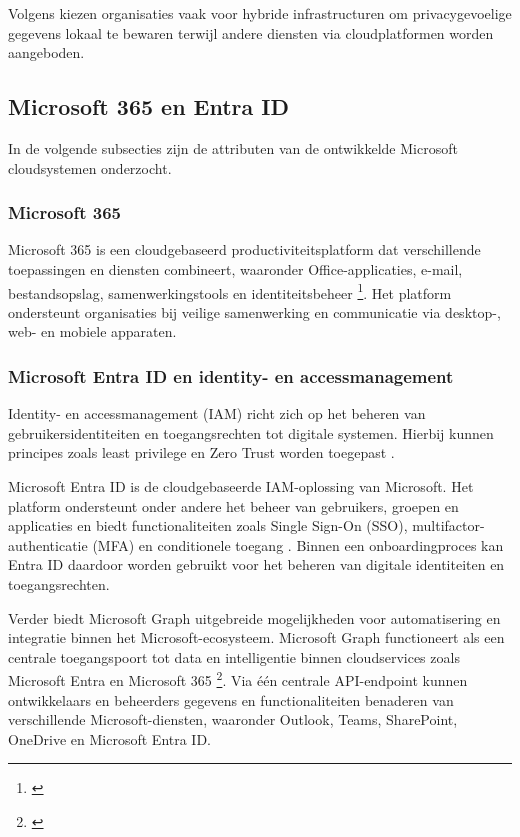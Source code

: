 Volgens \textcite{Ahuja2024} kiezen organisaties vaak voor hybride infrastructuren om privacygevoelige gegevens lokaal te bewaren terwijl andere diensten via cloudplatformen worden aangeboden.

\subsection{Microsoft 365 en Entra ID}

In de volgende subsecties zijn de attributen van de ontwikkelde Microsoft cloudsystemen onderzocht. 

\subsubsection{Microsoft 365}
Microsoft 365 is een cloudgebaseerd productiviteitsplatform dat verschillende toepassingen en diensten combineert, waaronder Office-applicaties, e-mail, bestandsopslag, samenwerkingstools en identiteitsbeheer \footnote{\autocite{Microsoftc}}. Het platform ondersteunt organisaties bij veilige samenwerking en communicatie via desktop-, web- en mobiele apparaten. 

\subsubsection{Microsoft Entra ID en identity- en accessmanagement}

Identity- en accessmanagement (IAM) richt zich op het beheren van gebruikersidentiteiten en toegangsrechten tot digitale systemen. Hierbij kunnen principes zoals least privilege en Zero Trust worden toegepast \autocite{Microsoft2026a}.

Microsoft Entra ID is de cloudgebaseerde IAM-oplossing van Microsoft. Het platform ondersteunt onder andere het beheer van gebruikers, groepen en applicaties en biedt functionaliteiten zoals Single Sign-On (SSO), multifactor-authenticatie (MFA) en conditionele toegang \autocite{Microsoft2026a}. Binnen een onboardingproces kan Entra ID daardoor worden gebruikt voor het beheren van digitale identiteiten en toegangsrechten.

Verder biedt Microsoft Graph uitgebreide mogelijkheden voor automatisering en integratie binnen het Microsoft-ecosysteem. Microsoft Graph functioneert als een centrale toegangspoort tot data en intelligentie binnen cloudservices zoals Microsoft Entra en Microsoft 365 \footnote{\autocite{Microsoft2026b}}. Via één centrale API-endpoint kunnen ontwikkelaars en beheerders gegevens en functionaliteiten benaderen van verschillende Microsoft-diensten, waaronder Outlook, Teams, SharePoint, OneDrive en Microsoft Entra ID.

